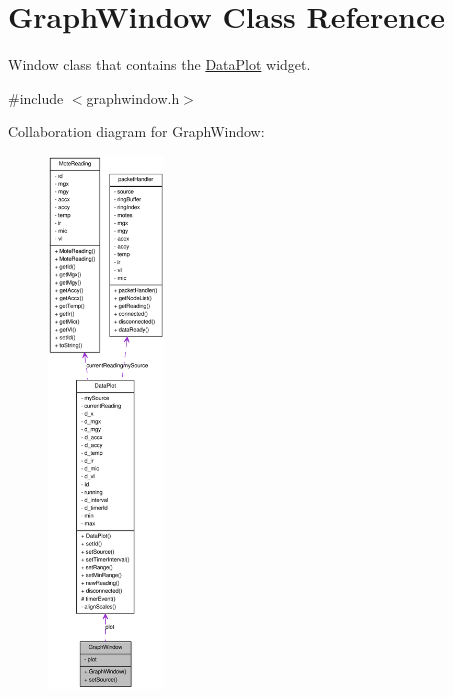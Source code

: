 \hypertarget{classGraphWindow}{
\section{GraphWindow Class Reference}
\label{classGraphWindow}
}


Window class that contains the \hyperlink{classDataPlot}{DataPlot} widget.  




{\ttfamily \#include $<$graphwindow.h$>$}



Collaboration diagram for GraphWindow:\nopagebreak
\begin{figure}[H]
\begin{center}
\leavevmode
\includegraphics[height=400pt]{classGraphWindow__coll__graph}
\end{center}
\end{figure}
